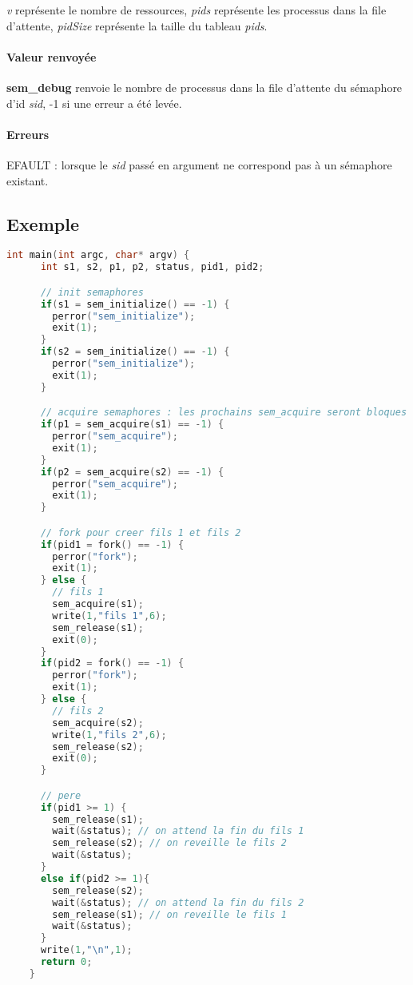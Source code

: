 \documentclass[12pt]{article}
\begin{document}
            \textit{v} représente le nombre de ressources, \textit{pids} représente les processus dans la file d'attente, \textit{pidSize} représente la taille du tableau \textit{pids}.

            \paragraph{Valeur renvoyée\\}
            \textbf{sem\_debug} renvoie le nombre de processus dans la file d'attente du sémaphore d'id \textit{sid}, -1 si une erreur a été levée.
            \paragraph{Erreurs\\}
            EFAULT : lorsque le \textit{sid} passé en argument ne correspond pas à un sémaphore existant.
    \newpage
    \subsection{Exemple}
    \begin{lstlisting}[language=C]
    int main(int argc, char* argv) {
      int s1, s2, p1, p2, status, pid1, pid2;

      // init semaphores
      if(s1 = sem_initialize() == -1) {
        perror("sem_initialize");
        exit(1);
      }
      if(s2 = sem_initialize() == -1) {
        perror("sem_initialize");
        exit(1);
      }

      // acquire semaphores : les prochains sem_acquire seront bloques
      if(p1 = sem_acquire(s1) == -1) {
        perror("sem_acquire");
        exit(1);
      }
      if(p2 = sem_acquire(s2) == -1) {
        perror("sem_acquire");
        exit(1);
      }

      // fork pour creer fils 1 et fils 2
      if(pid1 = fork() == -1) {
        perror("fork");
        exit(1);
      } else {
        // fils 1
        sem_acquire(s1);
        write(1,"fils 1",6);
        sem_release(s1);
        exit(0);
      }
      if(pid2 = fork() == -1) {
        perror("fork");
        exit(1);
      } else {
        // fils 2
        sem_acquire(s2);
        write(1,"fils 2",6);
        sem_release(s2);
        exit(0);
      }

      // pere
      if(pid1 >= 1) {
        sem_release(s1);
        wait(&status); // on attend la fin du fils 1
        sem_release(s2); // on reveille le fils 2
        wait(&status);
      }
      else if(pid2 >= 1){
        sem_release(s2);
        wait(&status); // on attend la fin du fils 2
        sem_release(s1); // on reveille le fils 1
        wait(&status);
      }
      write(1,"\n",1);
      return 0;
    }
    \end{lstlisting}
\end{document}
